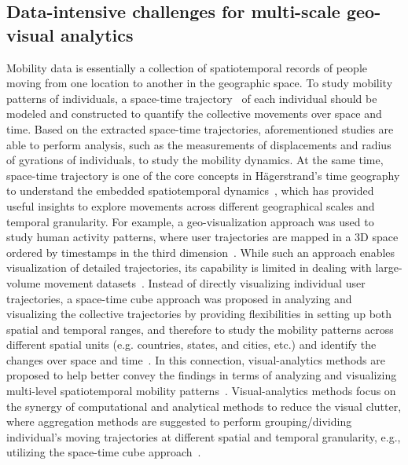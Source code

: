 \documentclass[a4paper, 11pt]{article}
\begin{document}
\subsection{Data-intensive challenges for multi-scale geo-visual analytics}
Mobility data is essentially a collection of spatiotemporal records of people moving from one location to another in the geographic space.
To study mobility patterns of individuals, a space-time trajectory~\citep{hagerstrand1985time} of each individual should be modeled and constructed to quantify the collective movements over space and time.
Based on the extracted space-time trajectories, aforementioned studies are able to perform analysis, such as the measurements of displacements and radius of gyrations of individuals, to study the mobility dynamics.
At the same time, space-time trajectory is one of the core concepts in H{\"a}gerstrand's time geography to understand the embedded spatiotemporal dynamics~\citep{hagerstrand1985time}, which has provided useful insights to explore movements across different geographical scales and temporal granularity.
For example, a geo-visualization approach was used to study human activity patterns, where user trajectories are mapped in a 3D space ordered by timestamps in the third dimension~\citep{kwan2004geovisualization}. While such an approach enables visualization of detailed trajectories, its capability is limited in dealing with large-volume movement datasets~\citep{andrienko2007designing}.
Instead of directly visualizing individual user trajectories, a space-time cube approach was proposed in analyzing and visualizing the collective trajectories by providing flexibilities in setting up both spatial and temporal ranges, and therefore to study the mobility patterns across different spatial units (e.g. countries, states, and cities, etc.) and identify the changes over space and time~\citep{maceachren2001research, maceachren2004maps}.
In this connection, visual-analytics methods are proposed to help better convey the findings in terms of analyzing and visualizing multi-level spatiotemporal mobility patterns~\citep{andrienko2007designing,andrienko2007visual}.
Visual-analytics methods focus on the synergy of computational and analytical methods to reduce the visual clutter, where aggregation methods are suggested to perform grouping/dividing individual's moving trajectories at different spatial and temporal granularity, e.g., utilizing the space-time cube approach~\citep{andrienko2007designing}.
\end{document}
